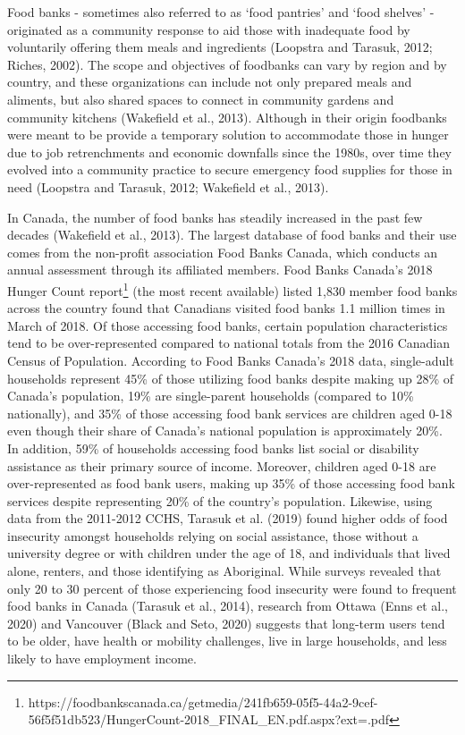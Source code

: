 \documentclass[]{elsarticle} %
\begin{document}
Food banks - sometimes also referred to as `food pantries' and `food
shelves' - originated as a community response to aid those with
inadequate food by voluntarily offering them meals and ingredients
(Loopstra and Tarasuk, 2012; Riches, 2002). The scope and objectives of
foodbanks can vary by region and by country, and these organizations can
include not only prepared meals and aliments, but also shared spaces to
connect in community gardens and community kitchens (Wakefield et al.,
2013). Although in their origin foodbanks were meant to be provide a
temporary solution to accommodate those in hunger due to job
retrenchments and economic downfalls since the 1980s, over time they
evolved into a community practice to secure emergency food supplies for
those in need (Loopstra and Tarasuk, 2012; Wakefield et al., 2013).

In Canada, the number of food banks has steadily increased in the past
few decades (Wakefield et al., 2013). The largest database of food banks
and their use comes from the non-profit association Food Banks Canada,
which conducts an annual assessment through its affiliated members. Food
Banks Canada's 2018 Hunger Count report\footnote{https://foodbankscanada.ca/getmedia/241fb659-05f5-44a2-9cef-56f5f51db523/HungerCount-2018\_FINAL\_EN.pdf.aspx?ext=.pdf}
(the most recent available) listed 1,830 member food banks across the
country found that Canadians visited food banks 1.1 million times in
March of 2018. Of those accessing food banks, certain population
characteristics tend to be over-represented compared to national totals
from the 2016 Canadian Census of Population. According to Food Banks
Canada's 2018 data, single-adult households represent 45\% of those
utilizing food banks despite making up 28\% of Canada's population, 19\%
are single-parent households (compared to 10\% nationally), and 35\% of
those accessing food bank services are children aged 0-18 even though
their share of Canada's national population is approximately 20\%. In
addition, 59\% of households accessing food banks list social or
disability assistance as their primary source of income. Moreover,
children aged 0-18 are over-represented as food bank users, making up
35\% of those accessing food bank services despite representing 20\% of
the country's population. Likewise, using data from the 2011-2012 CCHS,
Tarasuk et al. (2019) found higher odds of food insecurity amongst
households relying on social assistance, those without a university
degree or with children under the age of 18, and individuals that lived
alone, renters, and those identifying as Aboriginal. While surveys
revealed that only 20 to 30 percent of those experiencing food
insecurity were found to frequent food banks in Canada (Tarasuk et al.,
2014), research from Ottawa (Enns et al., 2020) and Vancouver (Black and
Seto, 2020) suggests that long-term users tend to be older, have health
or mobility challenges, live in large households, and less likely to
have employment income.
\end{document}
